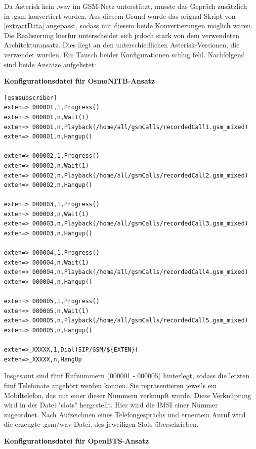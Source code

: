 Da Asterisk kein .wav im GSM-Netz unterstützt, musste das Gepräch zusätzlich in .gsm konvertiert werden. Aus diesem Grund wurde das orignal Skript von \ref{extractData} angepasst, sodass mit diesem beide Konvertierungen möglich waren.\\

Die Realisierung hierfür unterscheidet sich jedoch stark von dem verwendeten Architekturansatz. Dies liegt an den unterschiedlichen Asterisk-Versionen, die verwendet wurden. Ein Tausch beider Konfigurationen schlug fehl. Nachfolgend sind beide Ansätze aufgelistet:




\textbf{Konfigurationsdatei für OsmoNITB-Ansatz}

\begin{lstlisting}
[gsmsubscriber]
exten=> 000001,1,Progress()
exten=> 000001,n,Wait(1)
exten=> 000001,n,Playback(/home/all/gsmCalls/recordedCall1.gsm_mixed)
exten=> 000001,n,Hangup()

exten=> 000002,1,Progress()
exten=> 000002,n,Wait(1)
exten=> 000002,n,Playback(/home/all/gsmCalls/recordedCall2.gsm_mixed)
exten=> 000002,n,Hangup()

exten=> 000003,1,Progress()
exten=> 000003,n,Wait(1)
exten=> 000003,n,Playback(/home/all/gsmCalls/recordedCall3.gsm_mixed)
exten=> 000003,n,Hangup()

exten=> 000004,1,Progress()
exten=> 000004,n,Wait(1)
exten=> 000004,n,Playback(/home/all/gsmCalls/recordedCall4.gsm_mixed)
exten=> 000004,n,Hangup()

exten=> 000005,1,Progress()
exten=> 000005,n,Wait(1)
exten=> 000005,n,Playback(/home/all/gsmCalls/recordedCall5.gsm_mixed)
exten=> 000005,n,Hangup()

exten=>_XXXXX,1,Dial(SIP/GSM/${EXTEN})
exten=>_XXXXX,n,HangUp
\end{lstlisting}

Insgesamt sind fünf Rufnummern (000001 - 000005) hinterlegt, sodass die letzten fünf Telefonate angehört werden können. Sie repräsentieren jeweils ein Mobiltelefon, das mit einer dieser Nummern verknüpft wurde. Diese Verknüpfung wird in der Datei "slots" hergestellt. Hier wird die IMSI einer Nummer zugeordnet. 
Nach Aufzeichnen eines Telefongesprächs und erneutem Anruf wird die erzeugte .gsm/wav Datei, des jeweiligen Slots überschrieben.



\textbf{Konfigurationsdatei für OpenBTS-Ansatz}


